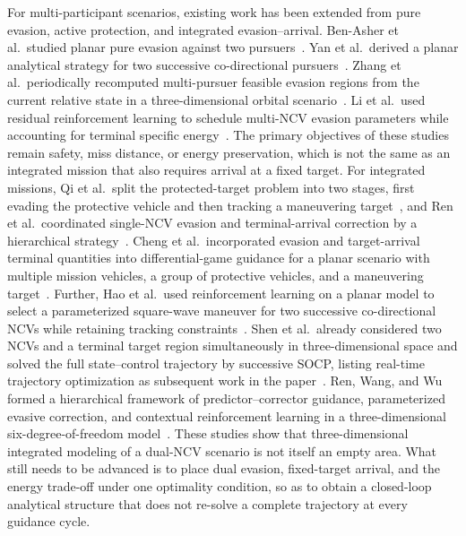 For multi-participant scenarios, existing work has been extended from pure evasion, active protection, and integrated evasion--arrival. Ben-Asher et al.\ studied planar pure evasion against two pursuers~\cite{benasher1988}. Yan et al.\ derived a planar analytical strategy for two successive co-directional pursuers~\cite{yan2020a}. Zhang et al.\ periodically recomputed multi-pursuer feasible evasion regions from the current relative state in a three-dimensional orbital scenario~\cite{zhang2023}. Li et al.\ used residual reinforcement learning to schedule multi-NCV evasion parameters while accounting for terminal specific energy~\cite{li2024cja}. The primary objectives of these studies remain safety, miss distance, or energy preservation, which is not the same as an integrated mission that also requires arrival at a fixed target. For integrated missions, Qi et al.\ split the protected-target problem into two stages, first evading the protective vehicle and then tracking a maneuvering target~\cite{qi2017}, and Ren et al.\ coordinated single-NCV evasion and terminal-arrival correction by a hierarchical strategy~\cite{ren2025}. Cheng et al.\ incorporated evasion and target-arrival terminal quantities into differential-game guidance for a planar scenario with multiple mission vehicles, a group of protective vehicles, and a maneuvering target~\cite{cheng2022}. Further, Hao et al.\ used reinforcement learning on a planar model to select a parameterized square-wave maneuver for two successive co-directional NCVs while retaining tracking constraints~\cite{hao2025}. Shen et al.\ already considered two NCVs and a terminal target region simultaneously in three-dimensional space and solved the full state--control trajectory by successive SOCP, listing real-time trajectory optimization as subsequent work in the paper~\cite{shen2022}. Ren, Wang, and Wu formed a hierarchical framework of predictor--corrector guidance, parameterized evasive correction, and contextual reinforcement learning in a three-dimensional six-degree-of-freedom model~\cite{ren2025nondy}. These studies show that three-dimensional integrated modeling of a dual-NCV scenario is not itself an empty area. What still needs to be advanced is to place dual evasion, fixed-target arrival, and the energy trade-off under one optimality condition, so as to obtain a closed-loop analytical structure that does not re-solve a complete trajectory at every guidance cycle.

